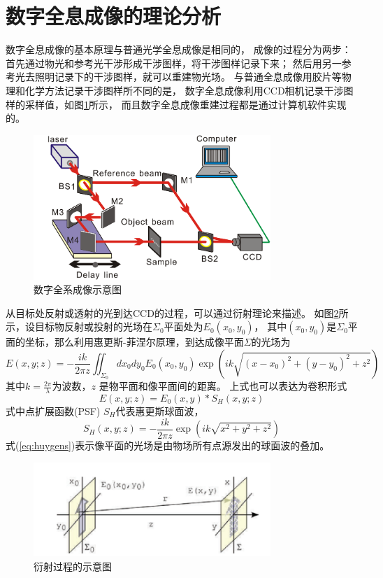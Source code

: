 \documentclass[11pt,a4paper]{article}
\begin{document}
\section{数字全息成像的理论分析}
数字全息成像的基本原理与普通光学全息成像是相同的，
成像的过程分为两步：首先通过物光和参考光干涉形成干涉图样，将干涉图样记录下来；
然后用另一参考光去照明记录下的干涉图样，就可以重建物光场。
与普通全息成像用胶片等物理和化学方法记录干涉图样所不同的是，
数字全息成像利用CCD相机记录干涉图样的采样值，如图\ref{fig:dh}所示，
而且数字全息成像重建过程都是通过计算机软件实现的。

\begin{figure}[htb]
  \centering
  \includegraphics[width=0.8\textwidth]{fig1.png}
  \caption{数字全系成像示意图}
  \label{fig:dh}
\end{figure}

从目标处反射或透射的光到达CCD的过程，可以通过衍射理论来描述。
如图\ref{fig:diffraction}所示，设目标物反射或投射的光场在$\Sigma_0$平面处为$E_0(x_0,y_0)$，
其中$(x_0, y_0)$是$\Sigma_0$平面的坐标，那么利用惠更斯-菲涅尔原理，到达成像平面$\Sigma$的光场为
\begin{equation}
E(x, y; z) = - \frac{i k}{2 \pi z} \iint_{\Sigma_0} dx_0 dy_0 E_0(x_0,y_0) \exp(i k \sqrt{(x-x_0)^2+(y-y_0)^2+z^2})
\label{eq:huygens}
\end{equation}
其中$k=\frac{2 \pi}{\lambda}$为波数，$z$ 是物平面和像平面间的距离。
上式也可以表达为卷积形式
\begin{equation}
E(x,y; z) = E_0(x , y) \ast S_H(x, y; z)
\end{equation}
式中点扩展函数(PSF) $S_H$代表惠更斯球面波，
\begin{equation}
S_H(x, y; z) =  - \frac{i k}{2 \pi z} \exp(i k \sqrt{x^2+y^2+z^2})
\end{equation}
式(\ref{eq:huygens})表示像平面的光场是由物场所有点源发出的球面波的叠加。

\begin{figure}[htb]
  \centering
  \includegraphics[width=0.8\textwidth]{diffraction.png}
  \caption{衍射过程的示意图}
  \label{fig:diffraction}
\end{figure}
\end{document}
